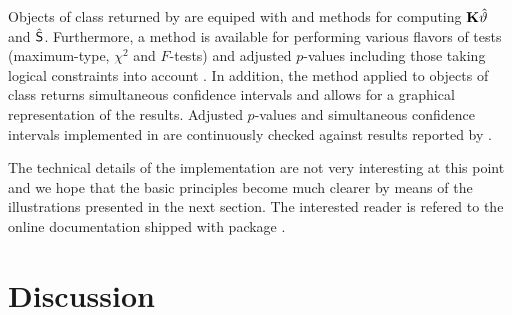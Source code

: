 \documentclass[12pt]{article}
\begin{document}
Objects of class  returned by  are equiped with
 and  methods for computing
$\K \hat{\vartheta}$ and $\hat{\S}$. Furthermore, a  method
is available for performing various flavors of tests (maximum-type, $\chi^2$ and 
$F$-tests) and adjusted $p$-values including those taking 
logical constraints into account \citep{Shaffer1986, Westfall1997}.
In addition, the  method applied to objects of class 
 returns simultaneous confidence intervals and allows
for a graphical representation of the results. Adjusted $p$-values and
simultaneous confidence intervals implemented in 
are continuously checked against results reported by
\cite{Westfall1999}.

The technical details of the implementation are not very interesting
at this point and we hope that the basic principles become much
clearer by means of the illustrations presented in the next section.
The interested reader is refered to the online documentation shipped
with package .





\section{Discussion}



\end{document}

